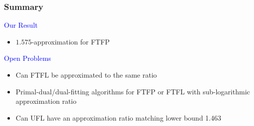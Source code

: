 \documentclass[handout, hyperref, dvipsnames]{beamer}
\begin{document}
\begin{frame}
  \frametitle{Summary}
  
  {\Large \textcolor{blue}{
  Our Result}}
  \begin{itemize}\addtolength{\itemsep}{1\baselineskip}
  \item $1.575$-approximation for FTFP
  \end{itemize}

  \vspace{.3in}
  {\Large \textcolor{blue}{
  Open Problems}}
  \begin{itemize}
  \item Can FTFL be approximated to the same ratio
  \item Primal-dual/dual-fitting algorithms for FTFP or FTFL with sub-logarithmic approximation ratio
  \item Can UFL have an approximation ratio matching lower bound 1.463
  \end{itemize}
\end{frame}

\end{document}
